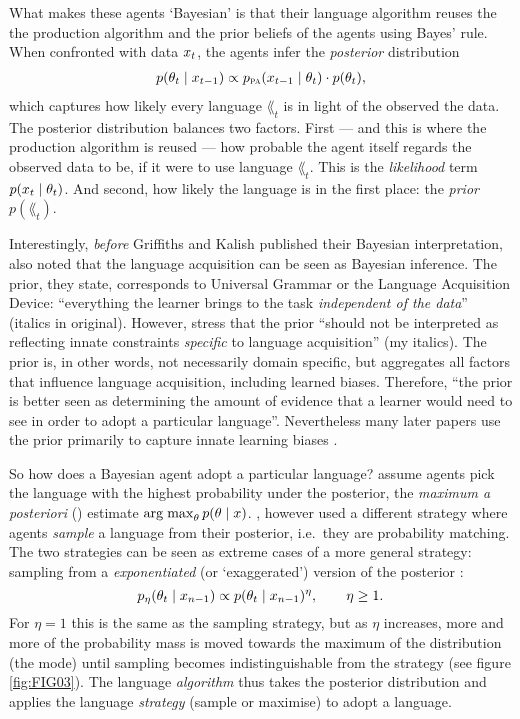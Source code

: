 \documentclass{../src/bcthesispart}
\begin{document}
What makes these agents ‘Bayesian’ is that their language algorithm reuses the the production algorithm and the prior beliefs of the agents using Bayes’ rule.
When confronted with data $x_t$, the agents infer the \emph{posterior} distribution
\begin{align}
	p(\theta_t \mid x_{t-1}) 
		\propto p_{\textsc{pa}}(x_{t-1} \mid \theta_t) 
			\cdot p(\theta_t),
\end{align}
which captures how likely every language $\lang_t$ is in light of the observed the data. 
The posterior distribution balances two factors. 
First --- and this is where the production algorithm is reused --- how probable the agent itself regards the observed data to be, if it were to use language $\lang_t$. This is the \emph{likelihood} term $p(x_t \mid \theta_t)$. 
And second, how likely the language is in the first place: the \emph{prior} $p(\lang_t)$.




Interestingly, \emph{before} Griffiths and Kalish published their Bayesian interpretation, \textcite{Kirby2004} also noted that the language acquisition can be seen as Bayesian inference.
The prior, they state, corresponds to Universal Grammar or the Language Acquisition Device: “everything the learner brings to the task \emph{independent of the data}” (italics in original). 
However, \textcite{Griffiths2007a} stress that the prior “should not be interpreted as reflecting innate constraints \emph{specific} to language acquisition” (my italics).
The prior is, in other words, not necessarily domain specific, but aggregates all factors that influence language acquisition, including learned biases.
Therefore, “the prior is better seen as determining the amount of evidence that a learner would need to see in order to adopt a particular language”. 
Nevertheless many later papers use the prior primarily to capture innate learning biases \parencite[e.g.][]{Kirby2014,Kirby2017}.




So how does a Bayesian agent adopt a particular language?
\textcite{Kirby2004} assume agents pick the language with the highest probability under the posterior, the \emph{maximum a posteriori} (\MAP) estimate $\operatorname{arg\; max}_\theta p(\theta \mid x)$.
\textcite{Griffiths2005}, however used a different strategy where agents \emph{sample} a language from their posterior, i.e.\ they are probability matching.
The two strategies can be seen as extreme cases of a more general strategy: sampling from a \emph{exponentiated} (or ‘exaggerated’) version of the posterior \parencite{Kirby2007}:
\begin{equation}
	p_\eta(\theta_t \mid x_{n-1}) 
		\propto p(\theta_t \mid x_{n-1})^\eta, 
	\qquad \eta \ge 1.
\end{equation}
For $\eta=1$ this is the same as the sampling strategy, but as $\eta$ increases, more and more of the probability mass is moved towards the maximum of the distribution (the mode) until sampling becomes indistinguishable from the \MAP{} strategy (see figure \ref{fig:FIG03}). 
The language \emph{algorithm} thus takes the posterior distribution and applies the language \emph{strategy} (sample or maximise) to adopt a language.
\end{document}
